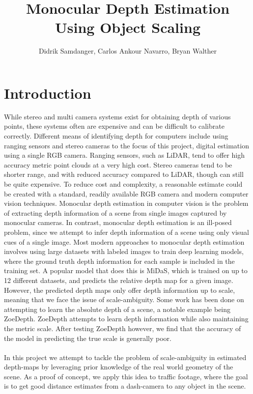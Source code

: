 \documentclass[12pt]{article}
\title{Monocular Depth Estimation Using Object Scaling \\ \smaller{TEK5030 Project Report}}
\author{Didrik Samdanger, Carlos Ankour Navarro, Bryan Walther}
\begin{document}
\maketitle

\section{Introduction}
While stereo and multi camera systems exist for obtaining depth of various points, these systems often are expensive and can be difficult to calibrate correctly. 
Different means of identifying depth for computers include using ranging sensors and stereo cameras to the focus of this project, digital estimation using a single RGB camera. Ranging sensors, such as LiDAR, tend to offer high accuracy metric point clouds at a very high cost. Stereo cameras tend to be shorter range, and with reduced accuracy compared to LiDAR, though can still be quite expensive. 
To reduce cost and complexity, a reasonable estimate could be created with a standard, readily available RGB camera and modern computer vision techniques.
Monocular depth estimation in computer vision is the problem of extracting depth information of a scene from single images captured by monocular cameras.
In contrast, monocular depth estimation is an ill-posed problem, since we attempt to infer depth information of a scene using only visual cues of a single image.
Most modern approaches to monocular depth estimation involves using large datasets with labeled images to train deep learning models, where the ground truth depth information for each sample is included in the training set.
A popular model that does this is MiDaS, which is trained on up to 12 different datasets, and predicts the relative depth map for a given image.
However, the predicted depth maps only offer depth information up to scale, meaning that we face the issue of scale-ambiguity.
Some work has been done on attempting to learn the absolute depth of a scene, a notable example being ZoeDepth.
ZoeDepth attempts to learn depth information while also maintaining the metric scale.
After testing ZoeDepth however, we find that the accuracy of the model in predicting the true scale is generally poor.
\\ \\
In this project we attempt to tackle the problem of scale-ambiguity in estimated depth-maps by leveraging prior knowledge of the real world geometry of the scene.
As a proof of concept, we apply this idea to traffic footage, where the goal is to get good distance estimates from a dash-camera to any object in the scene.
\end{document}

